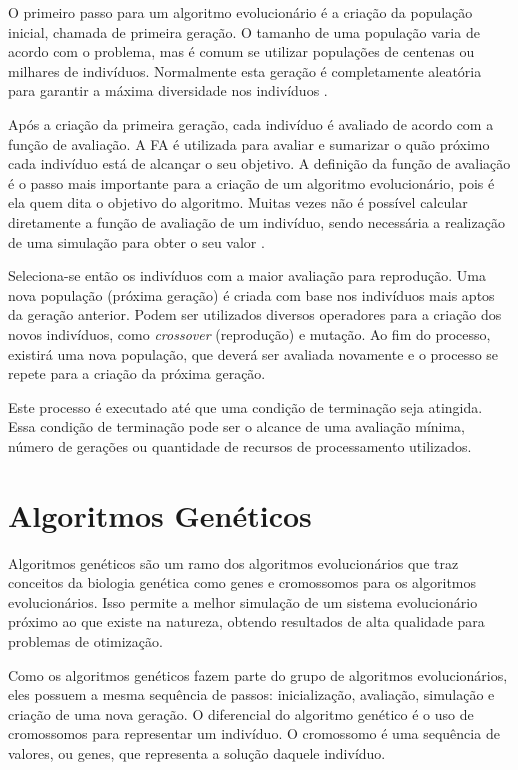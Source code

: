 \documentclass[12pt,oneside,a4paper,english,french,spanish,brazil,]{abntex2}
\begin{document}
O primeiro passo para um algoritmo evolucionário é a criação da população inicial, chamada de primeira geração. O tamanho de uma população varia de acordo com o problema, mas é comum se utilizar populações de centenas ou milhares de indivíduos. Normalmente esta geração é completamente aleatória para garantir a máxima diversidade nos indivíduos \cite{linden:2008}.

Após a criação da primeira geração, cada indivíduo é avaliado de acordo com a função de avaliação. A FA é utilizada para avaliar e sumarizar o quão próximo cada indivíduo está de alcançar o seu objetivo. A definição da função de avaliação é o passo mais importante para a criação de um algoritmo evolucionário, pois é ela quem dita o objetivo do algoritmo. Muitas vezes não é possível calcular diretamente a função de avaliação de um indivíduo, sendo necessária a realização de uma simulação para obter o seu valor \cite{linden:2008}.

Seleciona-se então os indivíduos com a maior avaliação para reprodução. Uma nova população (próxima geração) é criada com base nos indivíduos mais aptos da geração anterior. Podem ser utilizados diversos operadores para a criação dos novos indivíduos, como \textit{crossover} (reprodução) e mutação. Ao fim do processo, existirá uma nova população, que deverá ser avaliada novamente e o processo se repete para a criação da próxima geração.

Este processo é executado até que uma condição de terminação seja atingida. Essa condição de terminação pode ser o alcance de uma avaliação mínima, número de gerações ou quantidade de recursos de processamento utilizados.

\section{Algoritmos Genéticos}

Algoritmos genéticos são um ramo dos algoritmos evolucionários que traz conceitos da biologia genética como genes e cromossomos para os algoritmos evolucionários. Isso permite a melhor simulação de um sistema evolucionário próximo ao que existe na natureza, obtendo resultados de alta qualidade para problemas de otimização.

Como os algoritmos genéticos fazem parte do grupo de algoritmos evolucionários, eles possuem a mesma sequência de passos: inicialização, avaliação, simulação e criação de uma nova geração. O diferencial do algoritmo genético é o uso de cromossomos para representar um indivíduo. O cromossomo é uma sequência de valores, ou genes, que representa a solução daquele indivíduo.
\end{document}
